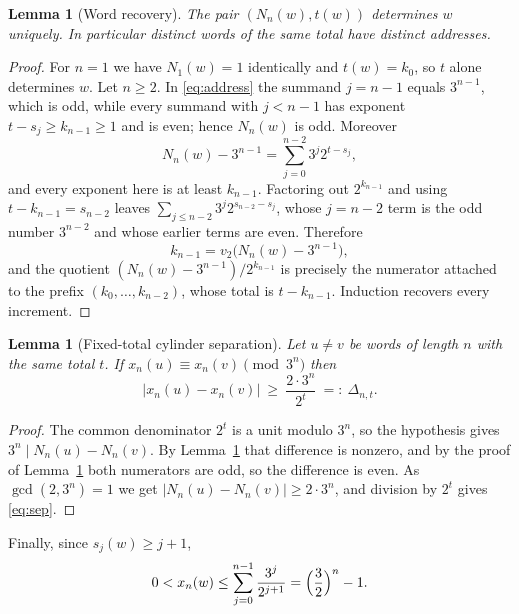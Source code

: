 \documentclass[11pt,reqno]{amsart}
\theoremstyle{plain}
\newtheorem{lemma}[theorem]{Lemma}
\theoremstyle{definition}
\theoremstyle{remark}
\begin{document}
\begin{lemma}[Word recovery]\label{lem:recovery}
The pair $(N_n(w),t(w))$ determines $w$ uniquely. In particular distinct
words of the same total have distinct addresses.
\end{lemma}

\begin{proof}
For $n=1$ we have $N_1(w)=1$ identically and $t(w)=k_0$, so $t$ alone
determines $w$. Let $n\ge2$. In \eqref{eq:address} the summand $j=n-1$
equals $3^{n-1}$, which is odd, while every summand with $j<n-1$ has
exponent $t-s_j\ge k_{n-1}\ge1$ and is even; hence $N_n(w)$ is odd.
Moreover
\[
N_n(w)-3^{n-1}=\sum_{j=0}^{n-2}3^j2^{t-s_j},
\]
and every exponent here is at least $k_{n-1}$. Factoring out
$2^{k_{n-1}}$ and using $t-k_{n-1}=s_{n-2}$ leaves
$\sum_{j\le n-2}3^j2^{s_{n-2}-s_j}$, whose $j=n-2$ term is the odd number
$3^{n-2}$ and whose earlier terms are even. Therefore
\begin{equation}
k_{n-1}=v_2\bigl(N_n(w)-3^{n-1}\bigr),
\label{eq:decode}
\end{equation}
and the quotient $(N_n(w)-3^{n-1})/2^{k_{n-1}}$ is precisely the numerator
attached to the prefix $(k_0,\ldots,k_{n-2})$, whose total is
$t-k_{n-1}$. Induction recovers every increment.
\end{proof}

\begin{lemma}[Fixed-total cylinder separation]\label{lem:separation}
Let $u\ne v$ be words of length $n$ with the same total $t$. If
$x_n(u)\equiv x_n(v)\pmod{3^n}$ then
\begin{equation}
|x_n(u)-x_n(v)|\ \ge\ \frac{2\cdot3^n}{2^t}\ =:\ \Delta_{n,t}.
\label{eq:sep}
\end{equation}
\end{lemma}

\begin{proof}
The common denominator $2^t$ is a unit modulo $3^n$, so the hypothesis
gives $3^n\mid N_n(u)-N_n(v)$. By Lemma~\ref{lem:recovery} that difference
is nonzero, and by the proof of Lemma~\ref{lem:recovery} both numerators
are odd, so the difference is even. As $\gcd(2,3^n)=1$ we get
$|N_n(u)-N_n(v)|\ge2\cdot3^n$, and division by $2^t$ gives \eqref{eq:sep}.
\end{proof}

Finally, since $s_j(w)\ge j+1$,
\begin{equation}
0<x_n(w)\le\sum_{j=0}^{n-1}\frac{3^j}{2^{j+1}}=\Bigl(\frac32\Bigr)^n-1 .
\label{eq:sizebound}
\end{equation}
\end{document}
